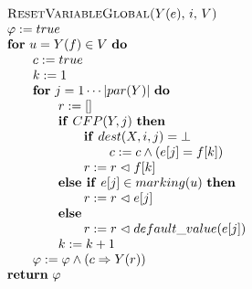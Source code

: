 \documentclass{article}
\begin{document}
\begin{equation*}
\begin{tabular}{l}
\textsc{ResetVariableGlobal(}$Y(e)$, $i,$ $V$\textsc{)} \\ 
$\varphi :=true$ \\ 
\textbf{for} $u=Y(f)\in V$ \textbf{do} \\ 
$\qquad c:=true$ \\ 
$\qquad k:=1$ \\ 
$\qquad $\textbf{for} $j=1\cdots \left\vert par(Y)\right\vert $ \textbf{do}
\\ 
$\qquad \qquad r:=[]$ \\ 
$\qquad \qquad $\textbf{if} $CFP(Y,j)$ \textbf{then} \\ 
$\qquad \qquad \qquad $\textbf{if} $dest(X,i,j)=\bot $ \\ 
$\qquad \qquad \qquad \qquad c:=c\wedge (e[j]=f[k])$ \\ 
$\qquad \qquad \qquad r:=r\vartriangleleft f[k]$ \\ 
$\qquad \qquad $\textbf{else if} $e[j]\in marking(u)$ \textbf{then} \\ 
$\qquad \qquad \qquad r:=r\vartriangleleft e[j]$ \\ 
$\qquad \qquad $\textbf{else} \\ 
$\qquad \qquad \qquad r:=r\vartriangleleft default\_value(e[j])$ \\ 
$\qquad \qquad k:=k+1$ \\ 
$\qquad \varphi :=\varphi \wedge (c\Rightarrow Y(r))$ \\ 
\textbf{return} $\varphi $%
\end{tabular}%
\end{equation*}%
\end{document}
